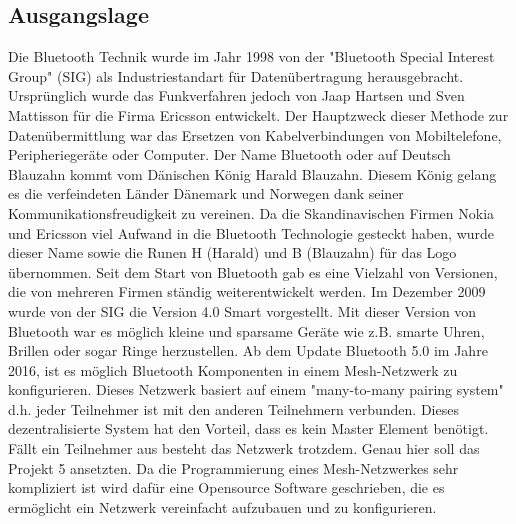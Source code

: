 
\subsection{Ausgangslage}\label{subsec:Ausgangslage}

Die Bluetooth Technik wurde im Jahr 1998 von der "Bluetooth Special Interest Group" (SIG) als Industriestandart für Datenübertragung herausgebracht. Ursprünglich wurde das Funkverfahren jedoch von Jaap Hartsen und Sven Mattisson für die Firma Ericsson entwickelt. Der Hauptzweck dieser Methode zur Datenübermittlung war das Ersetzen von Kabelverbindungen von Mobiltelefone, Peripheriegeräte oder Computer. Der Name Bluetooth oder auf Deutsch Blauzahn kommt vom Dänischen König Harald Blauzahn. Diesem König gelang es die verfeindeten Länder Dänemark und Norwegen dank seiner Kommunikationsfreudigkeit zu vereinen. Da die Skandinavischen Firmen Nokia und Ericsson viel Aufwand in die Bluetooth Technologie gesteckt haben, wurde dieser Name sowie die Runen H (Harald) und B (Blauzahn) für das Logo übernommen.\cite{michna_entwicklungsgeschichte_2019} Seit dem Start von Bluetooth gab es eine Vielzahl von Versionen, die von mehreren Firmen ständig weiterentwickelt werden. Im Dezember 2009 wurde von der SIG die Version 4.0 Smart vorgestellt. Mit dieser Version von Bluetooth war es möglich kleine und sparsame Geräte wie z.B. smarte Uhren, Brillen oder sogar Ringe herzustellen.\cite{bluetooth_sig_our_2019} Ab dem Update Bluetooth 5.0 im Jahre 2016, ist es möglich Bluetooth Komponenten in einem Mesh-Netzwerk zu konfigurieren. Dieses Netzwerk basiert auf einem "many-to-many pairing system" d.h. jeder Teilnehmer ist mit den anderen Teilnehmern verbunden. Dieses dezentralisierte System hat den Vorteil, dass es kein Master Element benötigt. Fällt ein Teilnehmer aus besteht das Netzwerk trotzdem. Genau hier soll das Projekt 5 ansetzten.\cite{woolley_intro_2017} Da die Programmierung eines Mesh-Netzwerkes sehr kompliziert ist wird dafür eine Opensource Software geschrieben, die es ermöglicht ein Netzwerk vereinfacht aufzubauen und zu konfigurieren.








